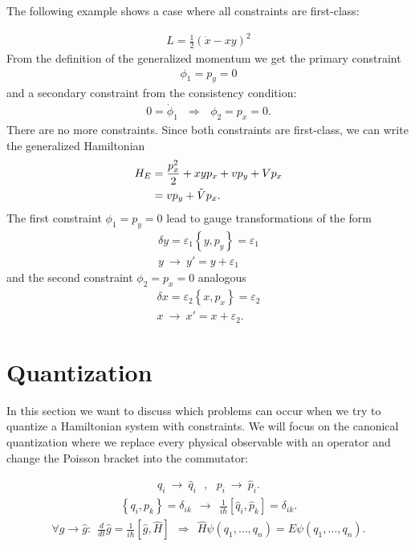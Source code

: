 The following example shows a case where all constraints are first-class:
\begin{example}
\begin{align}
L = \frac{1}{2} (\dot{x} - xy)^2
\end{align}
From the definition of the generalized momentum we get the primary constraint
\begin{align}
\phi_1 = p_y = 0
\end{align}
and a secondary constraint from the consistency condition:
\begin{align}
0 = \dot{\phi}_1 \ \ \ \Longrightarrow \ \ \ \phi_2 = p_x = 0.
\end{align}
There are no more constraints. Since both constraints are first-class, we can write the generalized Hamiltonian 
\begin{align}
H_E &= \frac{p_x^2}{2} + xy p_x + v p_y + V p_x \notag \\
&= v p_y + \tilde{V} p_x.
\end{align}
The first constraint $\phi_1 = p_y = 0$ lead to gauge transformations of the form
\begin{align}
\delta y = \varepsilon_1 \left \{ y, p_y \right \} = \varepsilon_1 \\
y \ \longrightarrow \ y' = y + \varepsilon_1
\end{align}
and the second constraint $\phi_2 = p_x = 0$ analogous
\begin{align}
\delta x = \varepsilon_2 \left \{ x, p_x \right \} = \varepsilon_2 \\
x \ \longrightarrow \ x' = x + \varepsilon_2.
\end{align}
\end{example}

\pagebreak

\section{Quantization}

In this section we want to discuss which problems can occur when we try to quantize a Hamiltonian system with constraints.
We will focus on the canonical quantization where we replace every physical observable with an operator and change the Poisson bracket into the commutator:

\begin{align}
q_i \ \longrightarrow \ \hat{q}_i \ \ \ , \ \ \ p_i \ \longrightarrow \ \hat{p}_i.
\end{align}
\begin{align}
\left \{ q_i , p_k \right \} = \delta_{ik} \ \ \longrightarrow \ \ \frac{1}{i \hbar} \left[ \hat{q}_i ,\hat{p}_k \right] = \delta_{ik}.
\end{align}
\begin{align}
\forall g \rightarrow \hat{g} : \ \ \frac{d}{dt} \hat{g} = \frac{1}{i \hbar} \left[ \hat{g} ,\hat{H} \right]  \ \ \Longrightarrow \ \ \hat{H} \psi(q_1, \dots, q_n) = E \psi(q_1, \dots, q_n).
\end{align}

